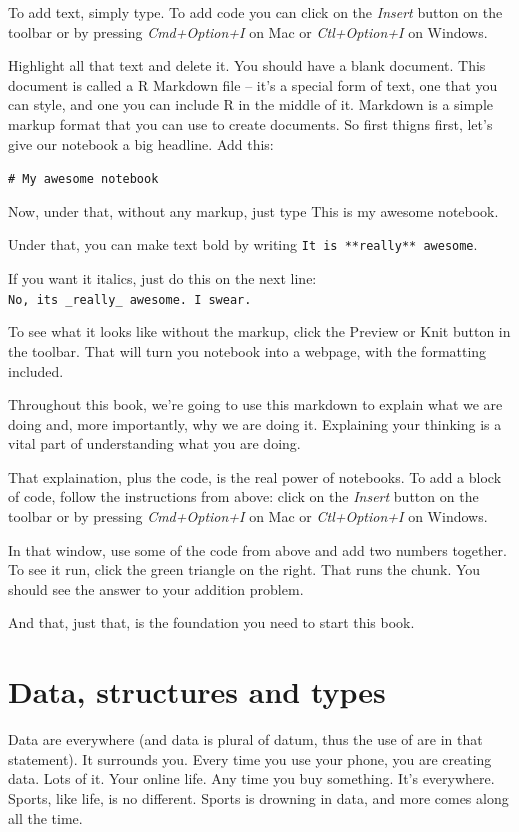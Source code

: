 \documentclass[]{book}
\begin{document}
To add text, simply type. To add code you can click on the \emph{Insert}
button on the toolbar or by pressing \emph{Cmd+Option+I} on Mac or
\emph{Ctl+Option+I} on Windows.

Highlight all that text and delete it. You should have a blank document.
This document is called a R Markdown file -- it's a special form of
text, one that you can style, and one you can include R in the middle of
it. Markdown is a simple markup format that you can use to create
documents. So first thigns first, let's give our notebook a big
headline. Add this:

\texttt{\#\ My\ awesome\ notebook}

Now, under that, without any markup, just type This is my awesome
notebook.

Under that, you can make text bold by writing
\texttt{It\ is\ **really**\ awesome}.

If you want it italics, just do this on the next line:
\texttt{No,\ it\textquotesingle{}s\ \_really\_\ awesome.\ I\ swear.}

To see what it looks like without the markup, click the Preview or Knit
button in the toolbar. That will turn you notebook into a webpage, with
the formatting included.

Throughout this book, we're going to use this markdown to explain what
we are doing and, more importantly, why we are doing it. Explaining your
thinking is a vital part of understanding what you are doing.

That explaination, plus the code, is the real power of notebooks. To add
a block of code, follow the instructions from above: click on the
\emph{Insert} button on the toolbar or by pressing \emph{Cmd+Option+I}
on Mac or \emph{Ctl+Option+I} on Windows.

In that window, use some of the code from above and add two numbers
together. To see it run, click the green triangle on the right. That
runs the chunk. You should see the answer to your addition problem.

And that, just that, is the foundation you need to start this book.

\chapter{Data, structures and types}\label{data-structures-and-types}

Data are everywhere (and data is plural of datum, thus the use of are in
that statement). It surrounds you. Every time you use your phone, you
are creating data. Lots of it. Your online life. Any time you buy
something. It's everywhere. Sports, like life, is no different. Sports
is drowning in data, and more comes along all the time.
\end{document}
